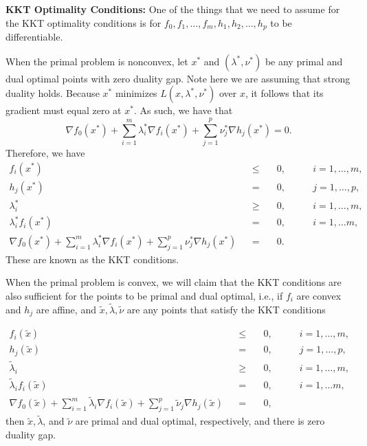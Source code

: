 	\textbf{KKT Optimality Conditions:} One of the things that we need to assume for the KKT optimality conditions is for $f_0 , f_1, \dots , f_m, h_1, h_2, \dots, h_p$ to be differentiable. 
	
	When the primal problem is nonconvex, let $x^*$ and $(\lambda^*, \nu^*)$ be any primal and dual optimal points with zero duality gap. Note here we are assuming that strong duality holds. Because $x^*$ minimizes $L(x, \lambda^*, \nu^*)$ over $x$, it follows that its gradient must equal zero at $x^*$. As such, we have that 
	$$
		\nabla f_0 (x^*) + \sum_{i=1}^{m} \lambda_i^* \nabla f_i (x^*) + \sum_{j=1}^{p} \nu_j^* \nabla h_j (x^*) = 0.
	$$
	Therefore, we have 
	\begin{equation} \label{nonconvex KKT}
		\begin{aligned}
			f_i (x^*)& &\leq \quad &0,\qquad & i = 1, \dots, m, \\
			h_j (x^*)& &= \quad &0,\qquad & j = 1, \dots, p, \\
			\lambda_i^*& &\geq \quad &0, \qquad & i = 1, \dots, m, \\
			\lambda_i^* f_i (x^*)& &= \quad &0, \qquad & i = 1, \dots m, \\
			\nabla f_0 (x^*) + \sum_{i=1}^{m} \lambda_i^* \nabla f_i (x^*) + \sum_{j=1}^{p} \nu_j^* \nabla h_j (x^*)& &= \quad &0.
		\end{aligned}
	\end{equation}
	 These are known as the KKT conditions. 
	 
	 When the primal problem is convex, we will claim that the KKT conditions are also sufficient for the points to be primal and dual optimal, i.e., if $f_i$ are convex and $h_j$ are affine, and $\tilde{x}, \tilde{\lambda}, \tilde{\nu}$ are any points that satisfy the KKT conditions
	 
	 \begin{equation} \label{convex KKT}
		 \begin{aligned}
			 f_i (\tilde{x})& &\leq \quad &0,\qquad & i = 1, \dots, m, \\
			 h_j (\tilde{x})& &= \quad &0,\qquad & j = 1, \dots, p, \\
			 \tilde{\lambda}_i& &\geq \quad &0, \qquad & i = 1, \dots, m, \\
			 \tilde{\lambda}_i f_i (\tilde{x})& &= \quad &0, \qquad & i = 1, \dots m, \\
			 \nabla f_0 (\tilde{x}) + \sum_{i=1}^{m} \tilde{\lambda}_i \nabla f_i (\tilde{x}) + \sum_{j=1}^{p} \tilde{\nu}_j \nabla h_j (\tilde{x})& &= \quad &0,
		 \end{aligned}
	 \end{equation}
	 then  $\tilde{x}, \tilde{\lambda}$, and $\tilde{\nu}$ are primal and dual optimal, respectively, and there is zero duality gap. 
	 
